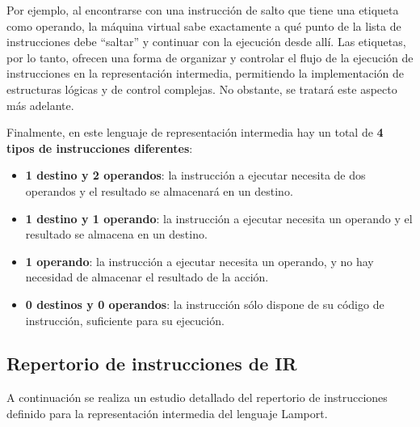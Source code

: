 \vspace{0.5cm}

Por ejemplo, al encontrarse con una instrucción de salto que tiene una etiqueta como operando, la máquina virtual sabe exactamente a qué punto de la lista de instrucciones debe ``saltar'' y continuar con la ejecución desde allí. Las etiquetas, por lo tanto, ofrecen una forma de organizar y controlar el flujo de la ejecución de instrucciones en la representación intermedia, permitiendo la implementación de estructuras lógicas y de control complejas. No obstante, se tratará este aspecto más adelante.

\vspace{0.5cm}
Finalmente, en este lenguaje de representación intermedia hay un total de \textbf{4 tipos de instrucciones diferentes}:

\begin{itemize}
    \item \textbf{1 destino y 2 operandos}: la instrucción a ejecutar necesita de dos operandos y el resultado se almacenará en un destino.
    \item \textbf{1 destino y 1 operando}: la instrucción a ejecutar necesita un operando y el resultado se almacena en un destino.
    \item \textbf{1 operando}: la instrucción a ejecutar necesita un operando, y no hay necesidad de almacenar el resultado de la acción.
    \item \textbf{0 destinos y 0 operandos}: la instrucción sólo dispone de su código de instrucción, suficiente para su ejecución.
\end{itemize}

\subsection{Repertorio de instrucciones de IR}
A continuación se realiza un estudio detallado del repertorio de instrucciones definido para la representación intermedia del lenguaje Lamport.

